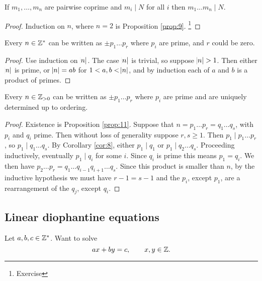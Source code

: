 \begin{corollary}
\label{cor:10}
If $ m_1, \dots, m_n $ are pairwise coprime and $ m_i \mid N $ for all $ i $ then $ m_1 \dots m_n \mid N $.
\end{corollary}

\begin{proof}
Induction on $ n $, where $ n = 2 $ is Proposition \ref{prop:9}. \footnote{Exercise}
\end{proof}

\begin{proposition}
\label{prop:11}
Every $ n \in \mathbb{Z}^* $ can be written as $ \pm p_1 \dots p_r $ where $ p_i $ are prime, and $ r $ could be zero.
\end{proposition}

\begin{proof}
Use induction on $ \abs{n} $. The case $ \abs{n} $ is trivial, so suppose $ \abs{n} > 1 $. Then either $ \abs{n} $ is prime, or $ \abs{n} = ab $ for $ 1 < a, b < \abs{n} $, and by induction each of $ a $ and $ b $ is a product of primes.
\end{proof}

\begin{theorem}
Every $ n \in \mathbb{Z}_{> 0} $ can be written as $ \pm p_1 \dots p_r $ where $ p_i $ are prime and are uniquely determined up to ordering.
\end{theorem}

\begin{proof}
Existence is Proposition \ref{prop:11}. Suppose that $ n = p_1 \dots p_r = q_1 \dots q_s $, with $ p_i $ and $ q_i $ prime. Then without loss of generality suppose $ r, s \ge 1 $. Then $ p_1 \mid p_1 \dots p_r $, so $ p_1 \mid q_1 \dots q_s $. By Corollary \ref{cor:8}, either $ p_1 \mid q_1 $ or $ p_1 \mid q_2 \dots q_s $. Proceeding inductively, eventually $ p_1 \mid q_i $ for some $ i $. Since $ q_i $ is prime this means $ p_1 = q_i $. We then have $ p_2 \dots p_r = q_1 \dots q_{i - 1}q_{i + 1} \dots q_s $. Since this product is smaller than $ n $, by the inductive hypothesis we must have $ r - 1 = s - 1 $ and the $ p_i $, except $ p_1 $, are a rearrangement of the $ q_j $, except $ q_i $.
\end{proof}

\subsection{Linear diophantine equations}

Let $ a, b, c \in \mathbb{Z}^* $. Want to solve
$$ ax + by = c, \qquad x, y \in \mathbb{Z}. $$

